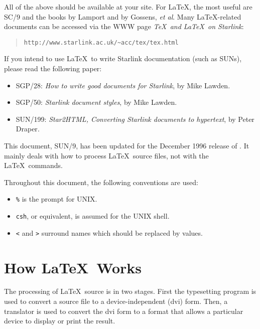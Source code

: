 \documentclass[11pt,twoside]{article}
\newcommand{\htmladdnormallink}[2]{#1}
\newcommand{\xref}[3]{#1}
\newcommand{\xlabel}[1]{}
\begin{document}
All of the above should be available at your site.
For \LaTeX, the most useful are SC/9
and the books by Lamport and by Gossens, \emph{et al}.
Many \LaTeX-related documents can be accessed via the WWW page
\emph{\TeX\ and \LaTeX\ on Starlink}:

\begin{quote}
      \htmladdnormallink{\texttt{http://www.starlink.ac.uk/\~{}acc/tex/tex.html}}
      {http://www.starlink.ac.uk/\~{}acc/tex/tex.html}
\end{quote}

If you intend to use \LaTeX\ to write Starlink documentation (such as SUNs),
please read the following paper:
\begin{itemize}
  \item \xref{SGP/28:
         \emph{How to write good documents for Starlink}}{sgp28}{},
         by Mike Lawden\cite{sgp28}.
  \item \xref{SGP/50:
         \emph{Starlink document styles}}{sgp50}{},
         by Mike Lawden\cite{sgp50}.
  \item \xref{SUN/199:
         \emph{Star2HTML, Converting Starlink documents to hypertext}}{sun199}{},
         by Peter Draper\cite{sun199}.
\end{itemize}

This document, SUN/9, has been updated for the December 1996 release of \LaTeXe.
It mainly deals with how to process \LaTeX\
source files, not with the \LaTeX\ commands.

Throughout this document, the following conventions are used:

\begin{itemize}
  \item \texttt{\%} is the prompt for UNIX.
  \item \texttt{csh}, or equivalent, is assumed for the UNIX shell.
  \item \texttt{<} and \texttt{>} surround names which should be replaced
        by values.
\end{itemize}

\section{\xlabel{how_latex_works}\label{how_latex_works}How \LaTeX\ Works}

The processing of \LaTeX\ source is in two stages. First the
typesetting program is used to convert a source file to a device-independent
(dvi) form. Then, a translator is used to convert the dvi form to a format that
allows a particular device to display or print the result.
\end{document}
